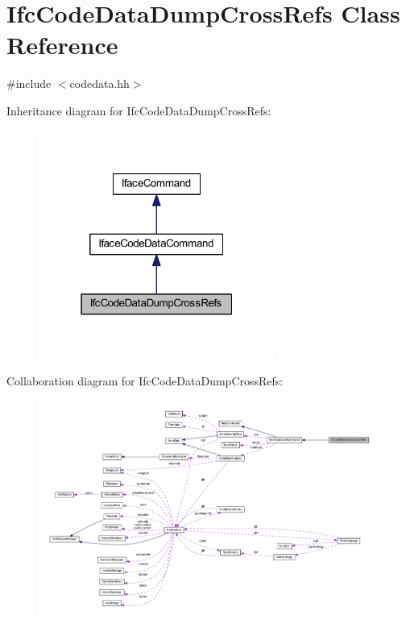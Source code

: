 \hypertarget{class_ifc_code_data_dump_cross_refs}{}\section{Ifc\+Code\+Data\+Dump\+Cross\+Refs Class Reference}
\label{class_ifc_code_data_dump_cross_refs}


{\ttfamily \#include $<$codedata.\+hh$>$}



Inheritance diagram for Ifc\+Code\+Data\+Dump\+Cross\+Refs\+:
\nopagebreak
\begin{figure}[H]
\begin{center}
\leavevmode
\includegraphics[width=220pt]{class_ifc_code_data_dump_cross_refs__inherit__graph}
\end{center}
\end{figure}


Collaboration diagram for Ifc\+Code\+Data\+Dump\+Cross\+Refs\+:
\nopagebreak
\begin{figure}[H]
\begin{center}
\leavevmode
\includegraphics[width=350pt]{class_ifc_code_data_dump_cross_refs__coll__graph}
\end{center}
\end{figure}
